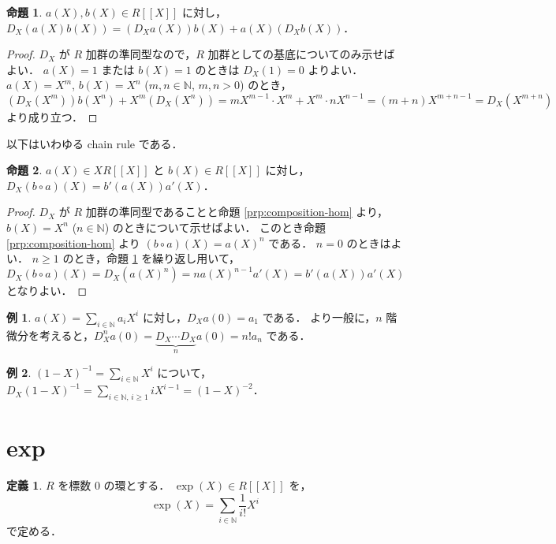 \documentclass{jsarticle}
\newcommand{\N}{\mathbb{N}}
\theoremstyle{definition}
\newtheorem*{Dfn}{定義}
\newtheorem*{Exm}{例}
\newtheorem{Prp}{命題}
\newenvironment{dfn}{\vspace{1ex}\begin{screen}\begin{Dfn}}{\end{Dfn}\end{screen}\vspace{1ex}}
\newenvironment{exm}{\begin{leftbar}\begin{Exm}}{\end{Exm}\end{leftbar}}
\newenvironment{prp}{\vspace{1ex}\begin{screen}\begin{Prp}}{\end{Prp}\end{screen}}
\newenvironment{prf}{\begin{leftbar}\begin{proof}}{\end{proof}\end{leftbar}}
\begin{document}
\begin{prp}
  \label{prp:leibniz}
  $a(X), b(X) \in R[[X]]$ に対し，$D_X(a(X) b(X)) = (D_X a(X)) b(X) + a(X) (D_X b(X))$．
\end{prp}
\begin{prf}
  $D_X$ が $R$ 加群の準同型なので，$R$ 加群としての基底についてのみ示せばよい．
  $a(X) = 1$ または $b(X) = 1$ のときは $D_X(1) = 0$ よりよい．
  $a(X) = X^m$, $b(X) = X^n$ ($m, n \in \N$, $m, n > 0$) のとき，
  \[
    (D_X(X^m)) b(X^n) + X^m (D_X(X^n))
    = m X^{m-1} \cdot X^m + X^m \cdot n X^{n-1}
    = (m + n) X^{m+n-1}
    = D_X(X^{m+n})
  \]
  より成り立つ．
\end{prf}

以下はいわゆる chain rule である．

\begin{prp}
  $a(X) \in X R[[X]]$ と $b(X) \in R[[X]]$ に対し，
  $D_X (b \circ a)(X) = b'(a(X)) a'(X)$．
\end{prp}
\begin{prf}
  $D_X$ が $R$ 加群の準同型であることと命題 \ref{prp:composition-hom} より，
  $b(X) = X^n$ ($n \in \N$) のときについて示せばよい．
  このとき命題 \ref{prp:composition-hom} より $(b \circ a)(X) = a(X)^n$ である．
  $n = 0$ のときはよい．
  $n \ge 1$ のとき，命題 \ref{prp:leibniz} を繰り返し用いて，
  \[
    D_X (b \circ a)(X)
    = D_X(a(X)^n)
    = n a(X)^{n-1} a'(X)
    = b'(a(X)) a'(X)
  \]
  となりよい．
\end{prf}

\begin{exm}
  $a(X) = \sum_{i\in\N} a_i X^i$ に対し，$D_X a(0) = a_1$ である．
  より一般に，$n$ 階微分を考えると，$D_X^n a(0) = \underbrace{D_X \cdots D_X}_n a(0) = n! a_n$ である．
\end{exm}

\begin{exm}
  $(1 - X)^{-1} = \sum_{i\in\N} X^i$ について，
  $D_X (1 - X)^{-1} = \sum_{i\in\N,\,i\ge 1} i X^{i-1} = (1 - X)^{-2}$．
\end{exm}


\section{exp}
\begin{dfn}
  $R$ を標数 $0$ の環とする．
  $\exp(X) \in R[[X]]$ を，
  \[
    \exp(X) = \sum_{i\in\N} \frac{1}{i!} X^i
  \]
  で定める．
\end{dfn}
\end{document}
